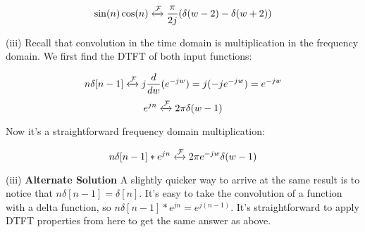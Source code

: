 \documentclass{article}
\begin{document}
$$\sin(n)\cos(n) \xleftrightarrow{\mathcal{F}} \frac{\pi}{2j} (\delta(w-2) - \delta(w+2))$$

\noindent (iii) Recall that convolution in the time domain is multiplication in the frequency domain. We first find the DTFT of both input functions:

$$n\delta[n-1] \xleftrightarrow{\mathcal{F}} j \frac{d}{dw}(e^{-jw}) = j(-je^{-jw}) = e^{-jw}$$
$$e^{jn} \xleftrightarrow{\mathcal{F}} 2\pi \delta(w-1)$$

\noindent Now it's a straightforward frequency domain multiplication:

$$n\delta[n-1]*e^{jn} \xleftrightarrow{\mathcal{F}} 2\pi e^{-jw} \delta(w-1)$$

\noindent (iii) \textbf{Alternate Solution} A slightly quicker way to arrive at the same result is to notice that $n\delta[n-1] = \delta[n]$. It's easy to take the convolution of a function with a delta function, so $n\delta[n-1]*e^{jn} = e^{j(n-1)}$. It's straightforward to apply DTFT properties from here to get the same answer as above.
\end{document}
